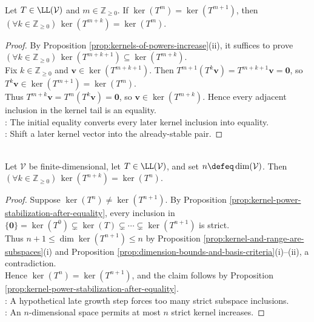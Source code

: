 \begin{proposition} \label{prop:kernel-power-stabilization-after-equality} \\
Let $T\in\LL(\mathcal{V})$ and $m\in\mathbb{Z}_{\geq0}$. If $\ker(T^m)=\ker(T^{m+1})$, then $(\forall k\in\mathbb{Z}_{\geq0})\,\ker(T^{m+k})=\ker(T^m)$.
\begin{proof}
By Proposition \ref{prop:kernels-of-powers-increase}(ii), it suffices to prove $(\forall k\in\mathbb{Z}_{\geq0})\,\ker(T^{m+k+1})\subseteq\ker(T^{m+k})$.\\
Fix $k\in\mathbb{Z}_{\geq0}$ and $\mathbf{v}\in\ker(T^{m+k+1})$. Then $T^{m+1}(T^k\mathbf{v})=T^{m+k+1}\mathbf{v}=\mathbf{0}$, so $T^k\mathbf{v}\in\ker(T^{m+1})=\ker(T^m)$.\\
Thus $T^{m+k}\mathbf{v}=T^m(T^k\mathbf{v})=\mathbf{0}$, so $\mathbf{v}\in\ker(T^{m+k})$. Hence every adjacent inclusion in the kernel tail is an equality.\\
: The initial equality converts every later kernel inclusion into equality.\\
: Shift a later kernel vector into the already-stable pair.
\end{proof}
\end{proposition}

\begin{theorem} \label{thm:kernel-powers-stabilize-by-dimension} \\
Let $\mathcal{V}$ be finite-dimensional, let $T\in\LL(\mathcal{V})$, and set $n\defeq\dim(\mathcal{V})$. Then $(\forall k\in\mathbb{Z}_{\geq0})\,\ker(T^{n+k})=\ker(T^n)$.
\begin{proof}
Suppose $\ker(T^n)\neq\ker(T^{n+1})$. By Proposition \ref{prop:kernel-power-stabilization-after-equality}, every inclusion in $\{\mathbf{0}\}=\ker(T^0)\subsetneq\ker(T)\subsetneq\cdots\subsetneq\ker(T^{n+1})$ is strict.\\
Thus $n+1\leq\dim\ker(T^{n+1})\leq n$ by Proposition \ref{prop:kernel-and-range-are-subspaces}(i) and Proposition \ref{prop:dimension-bounds-and-basis-criteria}(i)--(ii), a contradiction.\\
Hence $\ker(T^n)=\ker(T^{n+1})$, and the claim follows by Proposition \ref{prop:kernel-power-stabilization-after-equality}.\\
: A hypothetical late growth step forces too many strict subspace inclusions.\\
: An $n$-dimensional space permits at most $n$ strict kernel increases.
\end{proof}
\end{theorem}

